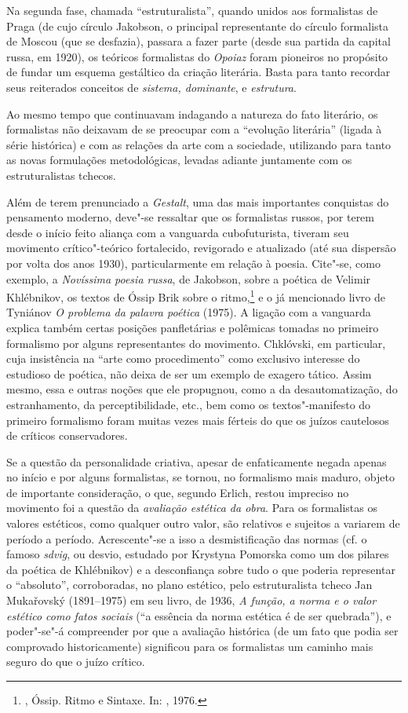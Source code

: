 {{{Na segunda fase, chamada ``estruturalista'', quando unidos aos
formalistas de Praga (de cujo círculo Jakobson, o principal
representante do círculo formalista de Moscou (que se desfazia),
passara a fazer parte (desde sua partida da capital russa, em 1920), os
teóricos formalistas do \emph{Opoiaz} foram pioneiros no propósito de
fundar um esquema gestáltico da criação literária. Basta para tanto
recordar seus reiterados conceitos de \emph{sistema, dominante}, e
\emph{estrutura}.

Ao mesmo tempo que continuavam indagando a natureza do fato literário,
os formalistas não deixavam de se preocupar com a ``evolução literária''
 (ligada à série histórica) e com as relações da arte com a sociedade, utilizando para
tanto as novas formulações metodológicas, levadas
adiante juntamente com os estruturalistas tchecos.

Além de terem prenunciado a \emph{Gestalt}, uma das
mais importantes conquistas do pensamento moderno, deve"-se ressaltar que
os formalistas russos, por terem desde o início feito aliança com a
vanguarda cubofuturista, tiveram seu movimento crítico"-teórico
fortalecido, revigorado e atualizado (até sua dispersão por volta dos
anos 1930), particularmente em relação à poesia. Cite"-se, como exemplo, a
\emph{Novíssima poesia russa}, de Jakobson, sobre a poética de Velimir
Khlébnikov, os textos de Óssip Brik sobre o ritmo,\footnote{, Óssip. Ritmo e Sintaxe. In: 
, 1976.} e o já mencionado
livro de Tyniánov \emph{O problema da palavra poética} (1975). A ligação com a
vanguarda explica também certas posições panfletárias e polêmicas
tomadas no primeiro formalismo por alguns representantes do movimento.
Chklóvski, em particular, cuja insistência na ``arte como
procedimento'' como exclusivo interesse do estudioso de
poética, não deixa de ser um exemplo de exagero tático. Assim mesmo, essa e outras noções que ele propugnou, como a
da desautomatização, do estranhamento, da perceptibilidade, etc., bem
como os textos"-manifesto do primeiro formalismo foram muitas vezes mais
férteis do que os juízos cautelosos de críticos conservadores.

Se a questão da personalidade criativa, apesar de enfaticamente negada apenas no início e por
alguns formalistas, se tornou, no formalismo mais
maduro, objeto de importante consideração, o que, segundo Erlich, restou impreciso no movimento foi a questão da
\emph{avaliação estética da obra}. Para os formalistas os valores
estéticos, como qualquer outro valor, são relativos e sujeitos a
variarem de período a período. Acrescente"-se a isso a desmistificação das
normas (cf. o famoso \emph{sdvig}, ou desvio, estudado por Krystyna
Pomorska como um dos pilares da poética de Khlébnikov) e a desconfiança
sobre tudo o que poderia representar o ``absoluto'', corroboradas,
no plano estético, pelo estruturalista tcheco Jan
Mukařovský (1891--1975) em seu livro, de 1936, \emph{A função, a norma e o valor
estético como fatos sociais} (``a essência da norma estética é de ser
quebrada''), e poder"-se"-á compreender por que a avaliação histórica (de
um fato que podia ser comprovado historicamente) significou para os
formalistas um caminho mais seguro do que o juízo crítico.

}}}

